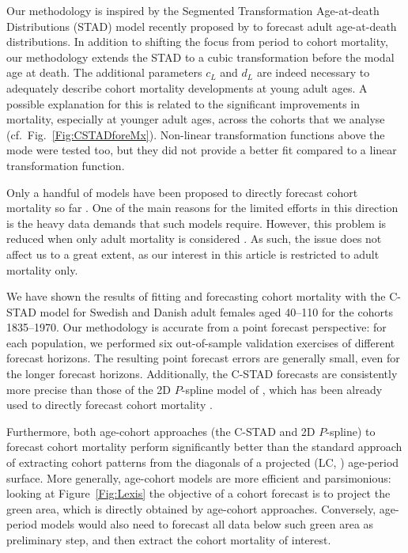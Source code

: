 \documentclass[11pt, a4paper]{article}
\begin{document}
Our methodology is inspired by the Segmented Transformation Age-at-death Distributions (STAD) model recently proposed by \cite{basellini2019modelling} to forecast adult age-at-death distributions. In addition to shifting the focus from period to cohort mortality, our methodology extends the STAD to a cubic transformation before the modal age at death. The additional parameters $c_L$ and $d_L$ are indeed necessary to adequately describe cohort mortality developments at young adult ages. A possible explanation for this is related to the significant improvements in mortality, especially at younger adult ages, across the cohorts that we analyse (cf.~Fig.~\ref{Fig:CSTADforeMx}). Non-linear transformation functions above the mode were tested too, but they did not provide a better fit compared to a linear transformation function. 

Only a handful of models have been proposed to directly forecast cohort mortality so far \citep{chiou2009modeling,zanotto2017reconstruction,rizzi2019forecasting}. One of the main reasons for the limited efforts in this direction is the heavy data demands that such models require. However, this problem is reduced when only adult mortality is considered \citep{booth2006demographic}. As such, the issue does not affect us to a great extent, as our interest in this article is restricted to adult mortality only. 

We have shown the results of fitting and forecasting cohort mortality with the C-STAD model for Swedish and Danish adult females {\color{red}aged 40--110} for the cohorts 1835--1970. Our methodology is accurate from a point forecast perspective: for each population, we performed six out-of-sample validation exercises of different forecast horizons. The resulting point forecast errors are generally small, even for the longer forecast horizons. Additionally, the C-STAD forecasts are consistently more precise than those of the 2D $P$-spline model of \cite{currie2004smoothing}, which has been already used to directly forecast cohort mortality \citep{cmi2007stochastic}. 

{\color{red} Furthermore, both age-cohort approaches (the C-STAD and 2D $P$-spline) to forecast cohort mortality perform significantly better than the standard approach of extracting cohort patterns from the diagonals of a projected \citeauthor{lee1992modeling} (LC, \citeyear{lee1992modeling}) age-period surface. More generally, age-cohort models are more efficient and parsimonious: looking at Figure~\ref{Fig:Lexis} the objective of a cohort forecast is to project the green area, which is directly obtained by age-cohort approaches. Conversely, age-period models would also need to forecast all data below such green area as preliminary step, and then extract the cohort mortality of interest. \par
}
\end{document}
